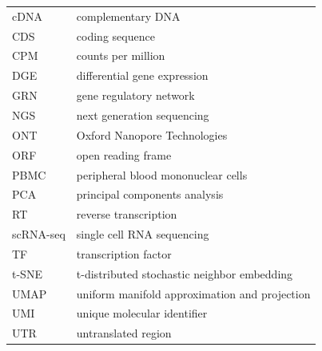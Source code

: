
\begin{tabular}{@{}ll@{}}
  cDNA & complementary DNA \\
  CDS & coding sequence \\
  CPM & counts per million \\
  DGE & differential gene expression \\
  GRN & gene regulatory network \\
  NGS & next generation sequencing \\
  ONT & Oxford Nanopore Technologies \\
  ORF & open reading frame \\
  PBMC & peripheral blood mononuclear cells \\
  PCA & principal components analysis \\
  RT & reverse transcription \\
  scRNA-seq & single cell RNA sequencing \\
  TF & transcription factor \\
  t-SNE & t-distributed stochastic neighbor embedding \\
  UMAP & uniform manifold approximation and projection \\
  UMI & unique molecular identifier \\
  UTR & untranslated region \\
\end{tabular}

